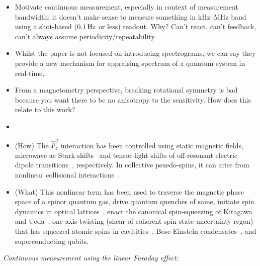 \documentclass[aps,prl,reprint,superscriptaddress,floatfix]{revtex4-1}
\begin{document}
\begin{itemize}
    \item Motivate continuous measurement, especially in context of measurement bandwidth; it doesn't make sense to measure something in kHz--MHz band using a shot-based ($\unit[0.1]{Hz}$ or less) readout. Why? Can't react, can't feedback, can't always assume periodicity/repeatability.
    \item Whilst the paper is not focused on introducing spectrograms, we can say they provide a new mechanism for appraising spectrum of a quantum system in real-time. 
    \item From a magnetometry perspective, breaking rotational symmetry is bad because you want there to be no anisotropy to the sensitivity. How does this relate to this work?
    \item {}
    \item (How) The $\hat{F}_z^2$ interaction has been controlled using static magnetic fields, microwave ac Stark shifts~\cite{gerbier_resonant_2006} and tensor-light shifts of off-resonant electric dipole transitions~\cite{smith_continuous_2004}, respectively.
    In collective psuedo-spins, it can arise from nonlinear collisional interactions~\cite{riedel_atom-chip-based_2010,*gross_nonlinear_2010}.
    \item (What) This nonlinear term has been used to traverse the magnetic phase space of a spinor quantum gas, drive quantum quenches of same, initiate spin dynamics in optical lattices~\cite{gerbier_resonant_2006}, enact the canonical spin-squeezing of Kitagawa and Ueda~\cite{kitagawa_squeezed_1993}: one-axis twisting (shear of coherent spin state uncertainty regon) that has squeezed atomic spins in cavitities~\cite{leroux_implementation_2010}, Bose-Einstein condensates~\cite{riedel_atom-chip-based_2010,*gross_nonlinear_2010}, and superconducting qubits.
\end{itemize}
\textit{Continuous measurement using the linear Faraday effect:}
\end{document}
